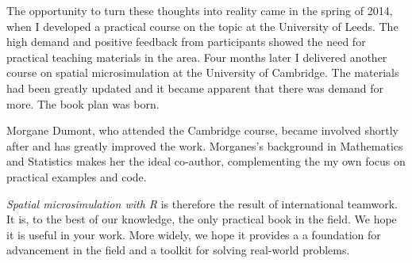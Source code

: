 The opportunity to turn these thoughts into reality came in the spring
of 2014, when I developed a practical course on the topic at
the University of Leeds.
The high demand and positive feedback from participants
showed the need for practical teaching materials in the area.
Four months later
I delivered another course on spatial microsimulation
at the University of Cambridge.
The materials had been greatly updated
and it became apparent that there was demand for more.
The book plan was born.

Morgane Dumont, who attended the Cambridge course,
became involved shortly after and has greatly improved the work.
Morganes's background in Mathematics and Statistics makes her the
ideal co-author, complementing the my own focus on practical examples
and code.



\emph{Spatial microsimulation with R} is therefore the
result of international teamwork.
It is, to the best of our knowledge, the only practical book in the
field. We hope it is useful in your work.
More widely, we hope it provides a
a foundation for advancement in the
field and a toolkit for solving real-world problems.

